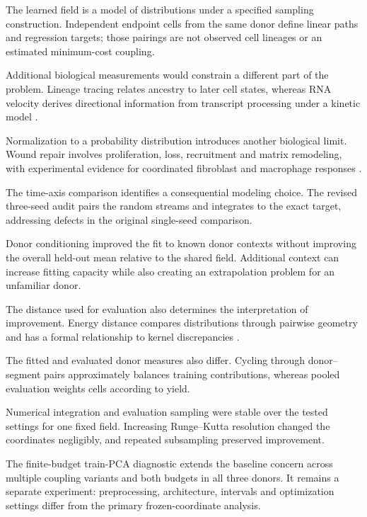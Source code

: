 \documentclass[10pt,a4paper]{article}
\begin{document}
The learned field is a model of distributions under a specified sampling construction. Independent endpoint cells from the same donor define linear paths and regression targets; those pairings are not observed cell lineages or an estimated minimum-cost coupling.

Additional biological measurements would constrain a different part of the problem. Lineage tracing relates ancestry to later cell states, whereas RNA velocity derives directional information from transcript processing under a kinetic model \citep{weinreb2020,lamanno2018,bergen2020}.

Normalization to a probability distribution introduces another biological limit. Wound repair involves proliferation, loss, recruitment and matrix remodeling, with experimental evidence for coordinated fibroblast and macrophage responses \citep{rognoni2018,shook2018}.

The time-axis comparison identifies a consequential modeling choice. The revised three-seed audit pairs the random streams and integrates to the exact target, addressing defects in the original single-seed comparison.

Donor conditioning improved the fit to known donor contexts without improving the overall held-out mean relative to the shared field. Additional context can increase fitting capacity while also creating an extrapolation problem for an unfamiliar donor.

The distance used for evaluation also determines the interpretation of improvement. Energy distance compares distributions through pairwise geometry and has a formal relationship to kernel discrepancies \citep{szekely2013,sejdinovic2013}.

The fitted and evaluated donor measures also differ. Cycling through donor--segment pairs approximately balances training contributions, whereas pooled evaluation weights cells according to yield.

Numerical integration and evaluation sampling were stable over the tested settings for one fixed field. Increasing Runge--Kutta resolution changed the coordinates negligibly, and repeated subsampling preserved improvement.

The finite-budget train-PCA diagnostic extends the baseline concern across multiple coupling variants and both budgets in all three donors. It remains a separate experiment: preprocessing, architecture, intervals and optimization settings differ from the primary frozen-coordinate analysis.
\end{document}

